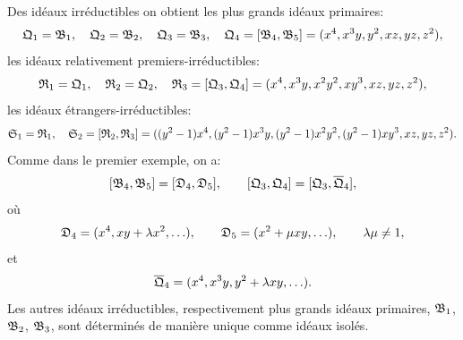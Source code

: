 Des idéaux irréductibles on obtient les plus grands idéaux primaires:
\[
\begin{gathered}
 \mathfrak{Q}_1=\mathfrak{B}_1,
 \quad \mathfrak{Q}_2=\mathfrak{B}_2,
 \quad \mathfrak{Q}_3=\mathfrak{B}_3,
 \quad
 \mathfrak{Q}_4=[\mathfrak{B}_4,\mathfrak{B}_5]=(x^4,x^3y,y^2,xz,yz,z^2),
\end{gathered}
\]
les idéaux relativement premiers-irréductibles:
\[
 \mathfrak{R}_1=\mathfrak{Q}_1,
 \quad \mathfrak{R}_2=\mathfrak{Q}_2,
 \quad
 \mathfrak{R}_3=[\mathfrak{Q}_3,\mathfrak{Q}_4]=(x^4,x^3y,x^2y^2,xy^3,xz,yz,z^2),
\]
les idéaux étrangers-irréductibles:
\[
 \mathfrak{S}_1=\mathfrak{R}_1,
 \quad \mathfrak{S}_2=[\mathfrak{R}_2,\mathfrak{R}_3]
 =((y^2-1)x^4,(y^2-1)x^3y,(y^2-1)x^2y^2,
 (y^2-1)xy^3,xz,yz,z^2).
\]
Comme dans le premier exemple, on a:
\[
 [\mathfrak{B}_4,\mathfrak{B}_5]=[\mathfrak{D}_4,\mathfrak{D}_5],
 \qquad
 [\mathfrak{Q}_3,\mathfrak{Q}_4]=[\mathfrak{Q}_3,
\overline{\mathfrak{Q}}_4],
\]
où
\[
 \mathfrak{D}_4=(x^4,xy+\lambda x^2,\ldots),\qquad
 \mathfrak{D}_5=(x^2+\mu xy,\ldots),\qquad \lambda\mu\ne1,
\]
et
\[
 \overline{\mathfrak{Q}}_4=(x^4,x^3y,y^2+\lambda xy,\ldots).
\]
Les autres idéaux irréductibles, respectivement plus grands idéaux primaires, $\mathfrak{B}_1$, $\mathfrak{B}_2$, $\mathfrak{B}_3$, sont déterminés de manière unique comme idéaux isolés.
